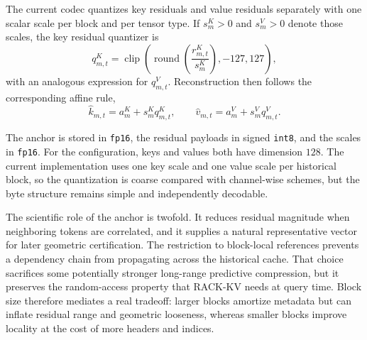 The current codec quantizes key residuals and value residuals separately with one scalar scale per block and per tensor type. If \(s^K_m>0\) and \(s^V_m>0\) denote those scales, the key residual quantizer is
\begin{equation}
  q^K_{m,t} = \operatorname{clip}\!\left(\operatorname{round}\!\left(\frac{r^K_{m,t}}{s^K_m}\right), -127, 127\right),
\end{equation}
with an analogous expression for \(q^V_{m,t}\). Reconstruction then follows the corresponding affine rule,
\begin{equation}
  \hat{k}_{m,t} = a^K_m + s^K_m q^K_{m,t},
  \qquad
  \hat{v}_{m,t} = a^V_m + s^V_m q^V_{m,t}.
\end{equation}

The anchor is stored in \texttt{fp16}, the residual payloads in signed \texttt{int8}, and the scales in \texttt{fp16}. For the \modeldisplay{} configuration, keys and values both have dimension \(128\). The current implementation uses one key scale and one value scale per historical block, so the quantization is coarse compared with channel-wise schemes, but the byte structure remains simple and independently decodable.

The scientific role of the anchor is twofold. It reduces residual magnitude when neighboring tokens are correlated, and it supplies a natural representative vector for later geometric certification. The restriction to block-local references prevents a dependency chain from propagating across the historical cache. That choice sacrifices some potentially stronger long-range predictive compression, but it preserves the random-access property that RACK-KV needs at query time. Block size therefore mediates a real tradeoff: larger blocks amortize metadata but can inflate residual range and geometric looseness, whereas smaller blocks improve locality at the cost of more headers and indices.
